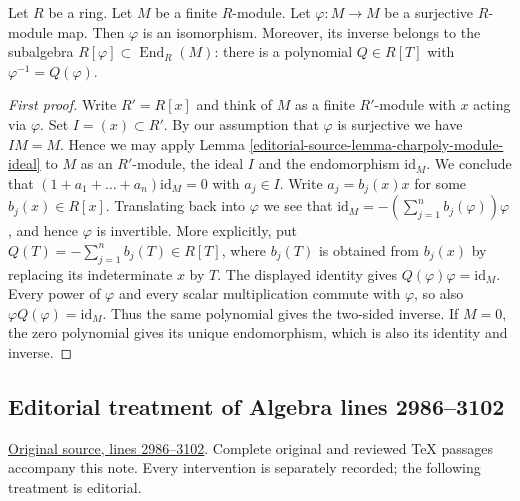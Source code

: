 \begin{lemma}
\label{editorial-source-lemma-fun}
Let $R$ be a ring.
Let $M$ be a finite $R$-module.
Let $\varphi : M \to M$ be a surjective $R$-module map.
Then $\varphi$ is an isomorphism. Moreover, its inverse belongs
to the subalgebra $R[\varphi]\subset\operatorname{End}_R(M)$:
there is a polynomial $Q\in R[T]$ with $\varphi^{-1}=Q(\varphi)$.
\end{lemma}

\begin{proof}[First proof]
Write $R' = R[x]$ and think of $M$ as a finite $R'$-module with
$x$ acting via $\varphi$. Set $I = (x) \subset R'$. By our assumption that
$\varphi$ is surjective we have $IM = M$. Hence we may apply
Lemma \ref{editorial-source-lemma-charpoly-module-ideal}
to $M$ as an $R'$-module, the ideal $I$ and the endomorphism $\text{id}_M$.
We conclude that
$(1 + a_1 + \ldots + a_n)\text{id}_M = 0$ with $a_j \in I$.
Write $a_j = b_j(x)x$ for some $b_j(x) \in R[x]$.
Translating back into $\varphi$ we see that
$\text{id}_M = -(\sum_{j = 1}^{n} b_j(\varphi)) \varphi$, and hence
$\varphi$ is invertible. More explicitly, put
$Q(T)=-\sum_{j=1}^{n}b_j(T)\in R[T]$, where $b_j(T)$ is
obtained from $b_j(x)$ by replacing its indeterminate $x$ by $T$.
The displayed identity gives $Q(\varphi)\varphi=\mathrm{id}_M$.
Every power of $\varphi$ and every scalar multiplication commute
with $\varphi$, so also $\varphi Q(\varphi)=\mathrm{id}_M$.
Thus the same polynomial gives the two-sided inverse.
If $M=0$, the zero polynomial gives its unique endomorphism,
which is also its identity and inverse.
\end{proof}


\subsection{Editorial treatment of Algebra lines 2986--3102}

\hypertarget{algebra-context-012}{}

\noindent\href{https://github.com/stacks/stacks-project/blob/a04446e57ec1fbc252a871afcec7752fb2807b14/algebra.tex\#L2986}{Original source, lines 2986--3102}. Complete original and reviewed TeX passages accompany this note. Every intervention is separately recorded; the following treatment is editorial.


